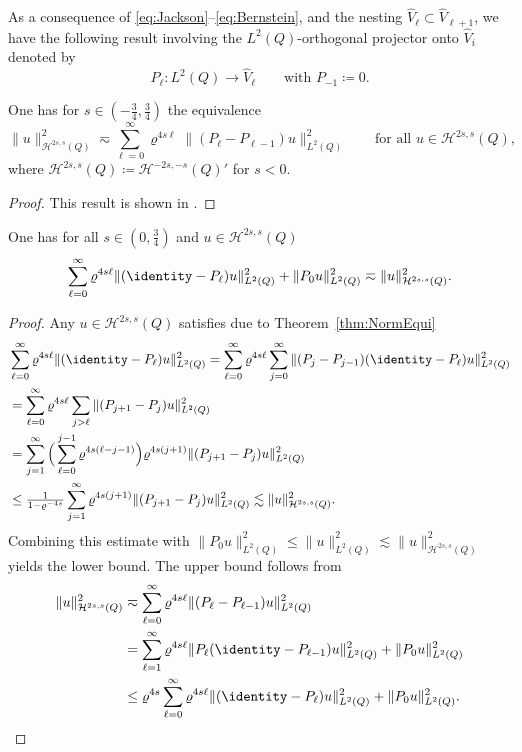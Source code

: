 \documentclass{amsart}
\newcommand{\cH}{\mathcal H}
\begin{document}
As a consequence of \eqref{eq:Jackson}--\eqref{eq:Bernstein}, and the nesting $\widehat{V}_\ell \subset \widehat{V}_{\ell+1}$, we have the following result involving the $L^2(Q)$-orthogonal projector onto $\widehat{V}_i$ denoted by
\begin{equation*}
P_\ell \colon L^2(Q) \to \widehat{V}_\ell\qquad\text{with } P_{-1}\coloneqq 0.
\end{equation*}
%
\begin{theorem}\label{thm:NormEqui}
 One has for $s \in (-\frac34,\frac34)$ the equivalence
\begin{equation*}
\|u\|^2_{\cH^{2s,s}(Q)} \eqsim \sum_{\ell=0}^\infty \varrho^{4s\ell}\|(P_\ell -P_{\ell-1})u\|_{L^2(Q)}^2 \qquad \text{for all }u \in \cH^{2s,s}(Q),
\end{equation*}
where $\cH^{2s,s}(Q)\coloneqq \cH^{-2s,-s}(Q)'$ for $s<0$.
\end{theorem}
\begin{proof}
This result is shown in \cite[Thm.~2.1]{DahmenStevenson99}.
\end{proof}
\begin{corollary} \label{corol:1} One has for all $s \in (0,\frac34)$ and $u \in \cH^{2s,s}(Q)$
\begin{equation*}
\sum_{\ell=0}^\infty \varrho^{4s\ell}\|(\identity - P_\ell)u\|_{L^2(Q)}^2 + \lVert P_0 u \rVert_{L^2(Q)}^2 \eqsim \|u\|^2_{\cH^{2s,s}(Q)}.
\end{equation*}
\end{corollary}
\begin{proof}
Any $u\in \cH^{2s,s}(Q)$ satisfies due to Theorem~\ref{thm:NormEqui}
\begin{align*}
&\sum_{\ell=0}^\infty \varrho^{4s\ell}\|(\identity - P_\ell)u\|_{L^2(Q)}^2
=\sum_{\ell=0}^\infty \varrho^{4s\ell}\sum_{j=0}^\infty \|(P_j-P_{j-1})(\identity - P_\ell)u\|_{L^2(Q)}^2
\\
&=\sum_{\ell=0}^\infty \varrho^{4s\ell} \sum_{j > \ell} \|(P_{j+1} - P_{j})u\|_{L^2(Q)}^2
\\
&=\sum_{j=1}^\infty \Big(\sum_{\ell=0}^{j-1} \varrho^{4s(\ell-j-1)} \Big)\varrho^{4s(j+1)}  \|(P_{j+1} - P_j)u\|_{L^2(Q)}^2\\
&\leq \tfrac{1}{1-\varrho^{-4 s}}\sum_{j=1}^\infty \varrho^{4s(j+1)}  \|(P_{j+1} - P_j)u\|_{L^2(Q)}^2\lesssim  \|u\|^2_{\cH^{2s,s}(Q)}.
\end{align*}
Combining this estimate with  $\lVert P_0 u \rVert_{L^2(Q)}^2\leq \lVert u \rVert_{L^2(Q)}^2 \lesssim \|u\|^2_{\cH^{2s,s}(Q)}$ yields the lower bound.
%
The upper bound follows from
\begin{align*}
\|u\|^2_{\cH^{2s,s}(Q)} &\eqsim \sum_{\ell=0}^\infty \varrho^{4s\ell}\|(P_\ell-P_{\ell-1})u\|_{L^2(Q)}^2 \\
&= \sum_{\ell=1}^\infty \varrho^{4s\ell}\|P_\ell( \identity -P_{\ell-1})u\|_{L^2(Q)}^2 + \lVert P_0 u\rVert_{L^2(Q)}^2\\
 &\leq \varrho^{4s} \sum_{\ell=0}^\infty \varrho^{4s\ell}\|(\identity - P_\ell)u\|_{L^2(Q)}^2 + \lVert P_0 u\rVert_{L^2(Q)}^2. \qedhere
\end{align*}
\end{proof}
\end{document}
